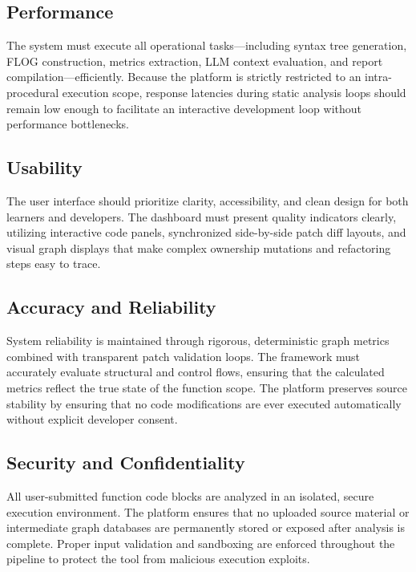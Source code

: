 \subsection{Performance}
\hspace{0.5cm}
The system must execute all operational tasks—including syntax tree generation, FLOG construction, metrics extraction, LLM context evaluation, and report compilation—efficiently. Because the platform is strictly restricted to an intra-procedural execution scope, response latencies during static analysis loops should remain low enough to facilitate an interactive development loop without performance bottlenecks.

\subsection{Usability}
\hspace{0.5cm}
The user interface should prioritize clarity, accessibility, and clean design for both learners and developers. The dashboard must present quality indicators clearly, utilizing interactive code panels, synchronized side-by-side patch diff layouts, and visual graph displays that make complex ownership mutations and refactoring steps easy to trace.

\subsection{Accuracy and Reliability}
\hspace{0.5cm}
System reliability is maintained through rigorous, deterministic graph metrics combined with transparent patch validation loops. The framework must accurately evaluate structural and control flows, ensuring that the calculated metrics reflect the true state of the function scope. The platform preserves source stability by ensuring that no code modifications are ever executed automatically without explicit developer consent.

\subsection{Security and Confidentiality}
\hspace{0.5cm}
All user-submitted function code blocks are analyzed in an isolated, secure execution environment. The platform ensures that no uploaded source material or intermediate graph databases are permanently stored or exposed after analysis is complete. Proper input validation and sandboxing are enforced throughout the pipeline to protect the tool from malicious execution exploits.

